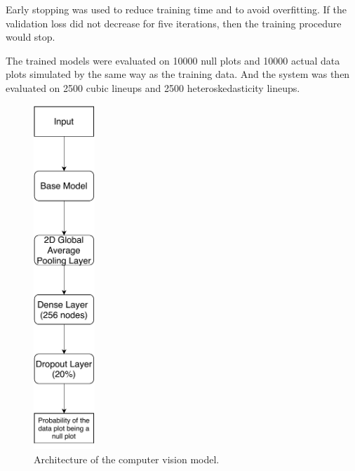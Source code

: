 \documentclass{monashthesis}
\theoremstyle{definition}
\theoremstyle{definition}
\theoremstyle{definition}
\theoremstyle{definition}
\theoremstyle{remark}
\begin{document}
Early stopping was used to reduce training time and to avoid overfitting. If the validation loss did not decrease for five iterations, then the training procedure would stop.

The trained models were evaluated on 10000 null plots and 10000 actual data plots simulated by the same way as the training data. And the system was then evaluated on 2500 cubic lineups and 2500 heteroskedasticity lineups.

\begin{figure}
\centering
\includegraphics[width=0.90625in,height=5.11458in]{figures/vi_model.pdf}
\caption{Architecture of the computer vision model. \label{fig:model-arch}}
\end{figure}

\begin{table}

\caption{\label{tab:vi-model-summary}Overview of the computer vision models.}
\centering
{}
\end{table}
\end{document}
